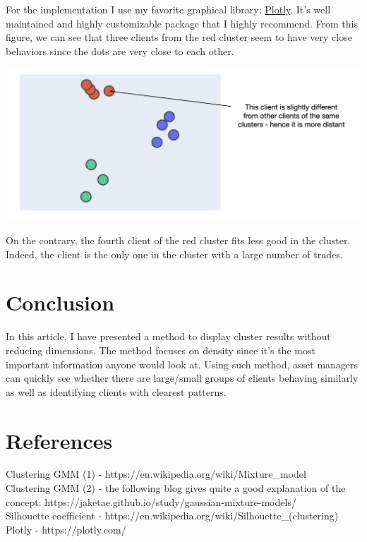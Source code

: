 For the implementation I use my favorite graphical library: \href{https://plotly.com/}{Plotly}. It's well maintained and highly customizable package that I highly recommend. From this figure, we can see that three clients from the red cluster seem to have very close behaviors since the dots are very close to each other. 

\begin{center}
\includegraphics[scale=0.5]{./../img/clusters-static-distance.png}
\end{center}

On the contrary, the fourth client of the red cluster fits less good in the cluster. Indeed, the client is the only one in the cluster with a large number of trades.

\section{Conclusion}

In this article, I have presented a method to display cluster results without reducing dimensions. The method focuses on density since it's the most important information anyone would look at. Using such method, asset managers can quickly see whether there are large/small groups of clients behaving similarly as well as identifying clients with clearest patterns.

\section{References}

Clustering GMM (1) - https://en.wikipedia.org/wiki/Mixture\_model \\

Clustering GMM (2)  - the following blog gives quite a good explanation of the concept: https://jaketae.github.io/study/gaussian-mixture-models/ \\

Silhouette coefficient - https://en.wikipedia.org/wiki/Silhouette\_(clustering) \\

Plotly - https://plotly.com/ \\


\vspace{10mm}